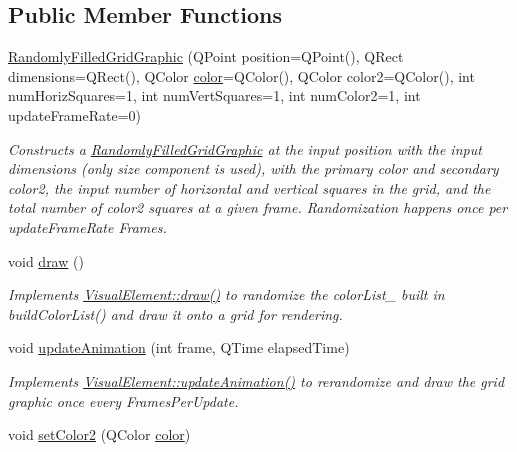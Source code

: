 \subsection*{Public Member Functions}
\begin{DoxyCompactItemize}
\item 
\hyperlink{class_picto_1_1_randomly_filled_grid_graphic_ad05324d26543dd9f22e0b12f6f6f2043}{Randomly\-Filled\-Grid\-Graphic} (Q\-Point position=Q\-Point(), Q\-Rect dimensions=Q\-Rect(), Q\-Color \hyperlink{struct_picto_1_1_visual_element_a45c3042c969717eb2ab60373369c7de7}{color}=Q\-Color(), Q\-Color color2=Q\-Color(), int num\-Horiz\-Squares=1, int num\-Vert\-Squares=1, int num\-Color2=1, int update\-Frame\-Rate=0)
\begin{DoxyCompactList}\small\item\em Constructs a \hyperlink{class_picto_1_1_randomly_filled_grid_graphic}{Randomly\-Filled\-Grid\-Graphic} at the input position with the input dimensions (only size component is used), with the primary color and secondary color2, the input number of horizontal and vertical squares in the grid, and the total number of color2 squares at a given frame. Randomization happens once per update\-Frame\-Rate Frames. \end{DoxyCompactList}\item 
\hypertarget{class_picto_1_1_randomly_filled_grid_graphic_a995008d405989ad9a65583ce819b7144}{void \hyperlink{class_picto_1_1_randomly_filled_grid_graphic_a995008d405989ad9a65583ce819b7144}{draw} ()}\label{class_picto_1_1_randomly_filled_grid_graphic_a995008d405989ad9a65583ce819b7144}

\begin{DoxyCompactList}\small\item\em Implements \hyperlink{struct_picto_1_1_visual_element_ad4a2003a51dadee2e5867abfafba68c1}{Visual\-Element\-::draw()} to randomize the color\-List\-\_\- built in build\-Color\-List() and draw it onto a grid for rendering. \end{DoxyCompactList}\item 
\hypertarget{class_picto_1_1_randomly_filled_grid_graphic_a0a4553545d058cd58a8eae97e6bc5c9f}{void \hyperlink{class_picto_1_1_randomly_filled_grid_graphic_a0a4553545d058cd58a8eae97e6bc5c9f}{update\-Animation} (int frame, Q\-Time elapsed\-Time)}\label{class_picto_1_1_randomly_filled_grid_graphic_a0a4553545d058cd58a8eae97e6bc5c9f}

\begin{DoxyCompactList}\small\item\em Implements \hyperlink{struct_picto_1_1_visual_element_a598c8f6e33c58b85b80197e3743b0e91}{Visual\-Element\-::update\-Animation()} to rerandomize and draw the grid graphic once every Frames\-Per\-Update. \end{DoxyCompactList}\item 
\hypertarget{class_picto_1_1_randomly_filled_grid_graphic_a5e43e785071b79026b583968c9f83e36}{void \hyperlink{class_picto_1_1_randomly_filled_grid_graphic_a5e43e785071b79026b583968c9f83e36}{set\-Color2} (Q\-Color \hyperlink{struct_picto_1_1_visual_element_a45c3042c969717eb2ab60373369c7de7}{color})}\label{class_picto_1_1_randomly_filled_grid_graphic_a5e43e785071b79026b583968c9f83e36}


\end{DoxyCompactItemize}
